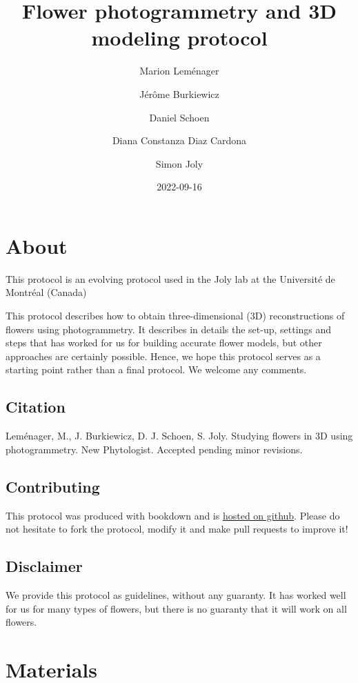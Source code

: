 \documentclass[
]{book}
\title{Flower photogrammetry and 3D modeling protocol}
\author{Marion Leménager \and Jérôme Burkiewicz \and Daniel Schoen \and Diana Constanza Diaz Cardona \and Simon Joly}
\date{2022-09-16}
\begin{document}
\maketitle

{
\setcounter{tocdepth}{1}
\tableofcontents
}
\hypertarget{about}{%
\chapter{About}\label{about}}

This protocol is an evolving protocol used in the Joly lab at the Université de Montréal (Canada)

This protocol describes how to obtain three-dimensional (3D) reconstructions of flowers using photogrammetry. It describes in details the set-up, settings and steps that has worked for us for building accurate flower models, but other approaches are certainly possible. Hence, we hope this protocol serves as a starting point rather than a final protocol. We welcome any comments.

\hypertarget{citation}{%
\section{Citation}\label{citation}}

Leménager, M., J. Burkiewicz, D. J. Schoen, S. Joly. Studying flowers in 3D using photogrammetry. New Phytologist. Accepted pending minor revisions.

\hypertarget{contributing}{%
\section{Contributing}\label{contributing}}

This protocol was produced with bookdown and is \href{https://github.com/plantevolution/photogrammetry-protocol}{hosted on github}. Please do not hesitate to fork the protocol, modify it and make pull requests to improve it!

\hypertarget{disclaimer}{%
\section{Disclaimer}\label{disclaimer}}

We provide this protocol as guidelines, without any guaranty. It has worked well for us for many types of flowers, but there is no guaranty that it will work on all flowers.

\hypertarget{materials}{%
\chapter{Materials}\label{materials}}
\end{document}
